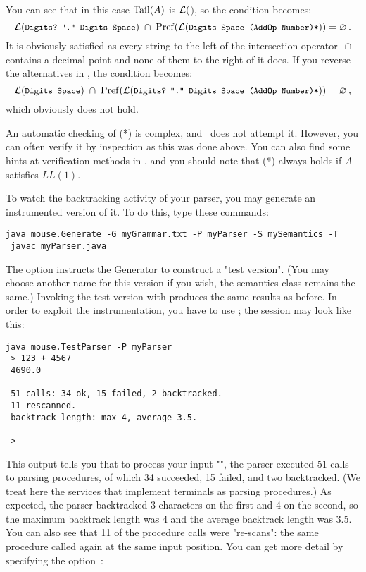 You can see that in this case $\operatorname{Tail}(A)$ is 
$\mathcal{L}($$)$, so the condition becomes:
%
\begin{equation*}
\sL($\stx{Digits?\;\,"." Digits Space}$)\; \cap \;\Pref(\sL($\stx{Digits Space (AddOp Number)*}$)) = \emptyset\,.
\end{equation*}
%
It is obviously satisfied as every string to the left of the intersection operator  $\,\cap\,$
contains a decimal point
and none of them to the right of it does.
If you reverse the alternatives in \Number,
the condition becomes:
%
\begin{equation*}
\sL($\stx{Digits Space}$)\; \cap\; \Pref(\sL($\stx{Digits?\;\,"." Digits Space (AddOp Number)*}$)) = \emptyset\,,
\end{equation*}
%
which obviously does not hold.

An automatic checking of (*) is complex, 
and \Mouse\ does not attempt it.
However, 
you can often verify it by inspection as this was done above.
You can also find some hints at verification methods in \cite{Redz:2013:FI,Redz:2014:FI},
and you should note that (*) always holds if $A$ satisfies $LL(1)$.

\medskip
To watch the backtracking activity of your parser,
you may generate an instrumented version of it.
To do this, type these commands:

\small
\begin{Verbatim}[samepage=true,xleftmargin=15mm,baselinestretch=0.8]
 java mouse.Generate -G myGrammar.txt -P myParser -S mySemantics -T
 javac myParser.java
\end{Verbatim}
\normalsize

The option  instructs the Generator to construct a "test version".
(You may choose another name for this version if you wish,
the semantics class remains the same.)
Invoking the test version with 
produces the same results as before.
In order to exploit the instrumentation, you have to use ;
the session may look like this:

\small
\begin{Verbatim}[samepage=true,xleftmargin=15mm,baselinestretch=0.8]
 java mouse.TestParser -P myParser
 > 123 + 4567
 4690.0

 51 calls: 34 ok, 15 failed, 2 backtracked.
 11 rescanned.
 backtrack length: max 4, average 3.5.

 >
\end{Verbatim}
\normalsize

This output tells you that to process your input "",
the parser executed 51 calls to parsing procedures,
of which 34 succeeded, 15 failed, and two backtracked.
(We treat here the services that implement terminals as parsing procedures.)
As expected, the parser backtracked 3 characters on the first 
and 4 on the second, so the maximum backtrack length was 4 
and the average backtrack length was 3.5.
You can also see that 11 of the procedure calls were "re-scans":
the same procedure called again at the same input position.
You can get more detail by specifying the option~:

